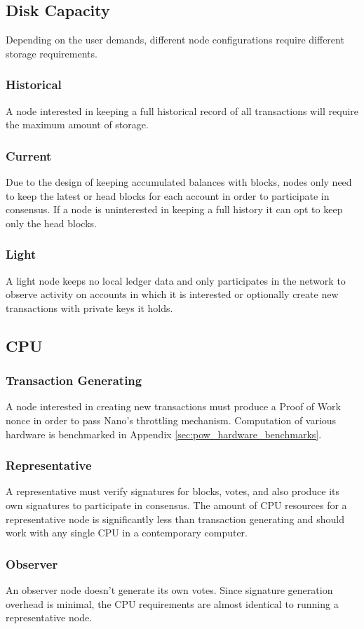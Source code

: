 \subsection{Disk Capacity}
Depending on the user demands, different node configurations require different storage requirements.

\subsubsection{Historical}
A node interested in keeping a full historical record of all transactions will require the maximum amount of storage.

\subsubsection{Current}
Due to the design of keeping accumulated balances with blocks, nodes only need to keep the latest or head blocks for each account in order to participate in consensus. If a node is uninterested in keeping a full history it can opt to keep only the head blocks.

\subsubsection{Light}
A light node keeps no local ledger data and only participates in the network to observe activity on accounts in which it is interested or optionally create new transactions with private keys it holds.

\subsection{CPU}
\subsubsection{Transaction Generating}
A node interested in creating new transactions must produce a Proof of Work nonce in order to pass Nano's throttling mechanism. Computation of various hardware is benchmarked in Appendix \ref{sec:pow_hardware_benchmarks}.

\subsubsection{Representative}
A representative must verify signatures for blocks, votes, and also produce its own signatures to participate in consensus. The amount of CPU resources for a representative node is significantly less than transaction generating and should work with any single CPU in a contemporary computer.

\subsubsection{Observer}
An observer node doesn't generate its own votes. Since signature generation overhead is minimal, the CPU requirements are almost identical to running a representative node.